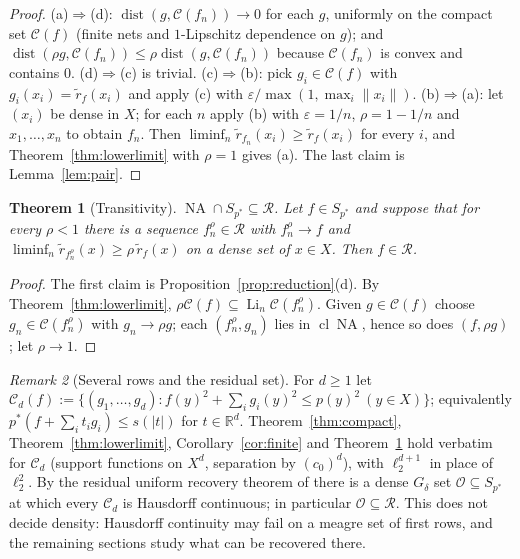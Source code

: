 \documentclass[10pt]{amsart}
\newtheorem{theorem}{Theorem}[section]
\theoremstyle{definition}
\theoremstyle{remark}
\newtheorem{remark}[theorem]{Remark}
\newcommand{\NA}{\operatorname{NA}}
\newcommand{\dist}{\operatorname{dist}}
\newcommand{\R}{\mathbb R}
\newcommand{\Cset}{\mathcal C}
\newcommand{\Li}{\operatorname*{Li}}
\newcommand{\cl}{\operatorname{cl}}
\newcommand{\Rec}{\mathcal R}
\begin{document}
\begin{proof}
(a)$\Rightarrow$(d): $\dist(g,\Cset(f_n))\to0$ for each $g$, uniformly on
the compact set $\Cset(f)$ (finite nets and $1$-Lipschitz dependence on
$g$); and $\dist(\rho g,\Cset(f_n))\le\rho\dist(g,\Cset(f_n))$ because
$\Cset(f_n)$ is convex and contains $0$.  (d)$\Rightarrow$(c) is trivial.
(c)$\Rightarrow$(b): pick $g_i\in\Cset(f)$ with $g_i(x_i)=\tilde r_f(x_i)$
and apply (c) with $\varepsilon/\max(1,\max_i\|x_i\|)$.
(b)$\Rightarrow$(a): let $(x_i)$ be dense in $X$; for each $n$ apply (b)
with $\varepsilon=1/n$, $\rho=1-1/n$ and $x_1,\dots,x_n$ to obtain $f_n$.
Then $\liminf_n\tilde r_{f_n}(x_i)\ge\tilde r_f(x_i)$ for every $i$, and
Theorem~\ref{thm:lowerlimit} with $\rho=1$ gives (a).  The
last claim is Lemma~\ref{lem:pair}.
\end{proof}

\begin{theorem}[Transitivity]\label{thm:transitivity}
$\NA\cap S_{p^*}\subseteq\Rec$.  Let $f\in S_{p^*}$ and suppose that for
every $\rho<1$ there is a sequence $f^\rho_n\in\Rec$ with $f_n^\rho\to f$
and $\liminf_n\tilde r_{f_n^\rho}(x)\ge\rho\,\tilde r_f(x)$ on a dense set
of $x\in X$.  Then $f\in\Rec$.
\end{theorem}

\begin{proof}
The first claim is Proposition~\ref{prop:reduction}(d).  By
Theorem~\ref{thm:lowerlimit}, $\rho\Cset(f)\subseteq\Li_n\Cset(f^\rho_n)$.
Given $g\in\Cset(f)$ choose $g_n\in\Cset(f_n^\rho)$ with $g_n\to\rho g$;
each $(f_n^\rho,g_n)$ lies in $\cl\NA$, hence so does $(f,\rho g)$; let
$\rho\to1$.
\end{proof}

\begin{remark}[Several rows and the residual set]\label{rem:joint}
For $d\ge1$ let
$\Cset_d(f):=\{(g_1,\dots,g_d):f(y)^2+\sum_ig_i(y)^2\le p(y)^2\ (y\in X)\}$;
equivalently $p^*(f+\sum_it_ig_i)\le s(|t|)$ for $t\in\R^d$.
Theorem~\ref{thm:compact}, Theorem~\ref{thm:lowerlimit},
Corollary~\ref{cor:finite} and Theorem~\ref{thm:transitivity} hold verbatim
for $\Cset_d$ (support functions on $X^d$, separation by $(c_0)^d$), with
$\ell_2^{d+1}$ in place of $\ell_2^2$.  By the residual uniform recovery
theorem of \cite{PrA} there
is a dense $G_\delta$ set $\mathcal O\subseteq S_{p^*}$ at which every $\Cset_d$
is Hausdorff continuous; in particular $\mathcal O\subseteq\Rec$.  This does not
decide density: Hausdorff continuity may fail on a meagre set of first
rows, and the remaining sections study what can be recovered there.
\end{remark}
\end{document}
